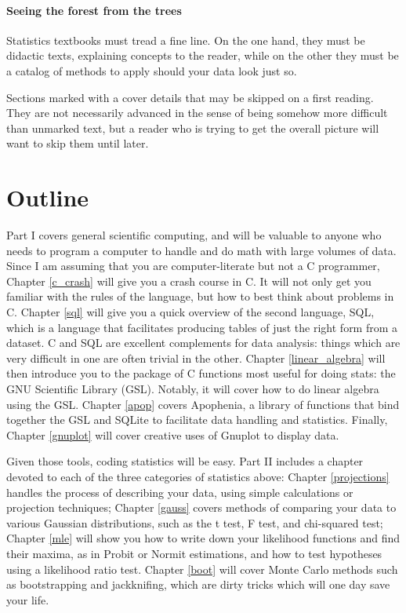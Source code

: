 \documentclass[12pt,notitlepage, openany]{book}
\def\ind#1{\index{#1}#1}
\begin{document}
\begin{multicols}{2}
\paragraph{Seeing the forest from the trees} Statistics textbooks
must tread a fine line. On the one hand, they must be didactic texts,
explaining concepts to the reader, while on the other they must be a
catalog of methods to apply should your data look just so.

Sections marked with a \ind{\treesymbol} cover details that may be
skipped on a first reading. They are not necessarily advanced
in the sense of being somehow more difficult than unmarked text, but a
reader who is trying to get the overall picture will want to skip them
until later. 





\section{Outline} 
Part I covers general scientific computing, and will be valuable to
anyone who needs to program a computer to handle and do math with large volumes of data.
Since I am assuming that you are computer-literate but
not a C programmer, Chapter \ref{c_crash} will give you a crash course
in C. It will not only get you familiar with the rules of the language,
but how to best think about problems in C. 
Chapter \ref{sql} will give you a quick overview of the second language,
SQL, which is a language that facilitates
producing tables of just the right form from a dataset. C and SQL are
excellent complements for data analysis: things which are very difficult
in one are often trivial in the other.
Chapter \ref{linear_algebra}
will then introduce you to the package of C functions most useful for
doing stats: the GNU Scientific Library (GSL). Notably, it will cover
how to do linear algebra using the GSL. Chapter \ref{apop} covers
Apophenia, a library of functions that bind together the GSL and SQLite
to facilitate data handling and statistics. Finally, Chapter
\ref{gnuplot} will cover creative uses of Gnuplot to display data.


Given those tools, coding statistics will be easy. Part II includes a chapter
devoted to each of the three categories of statistics above: Chapter \ref{projections}
handles the process of describing your data, using simple calculations
or projection techniques; Chapter
\ref{gauss} covers methods of comparing your data to various Gaussian
distributions, such as the t test, F test, and chi-squared test; Chapter
\ref{mle} will show you how to write down your likelihood functions and
find their maxima, as in Probit or Normit estimations, and how to test
hypotheses using a likelihood ratio test. Chapter \ref{boot} will cover
Monte Carlo methods such as 
bootstrapping and jackknifing, which are dirty tricks which will one
day save your life.  


\end{multicols}
\end{document}
